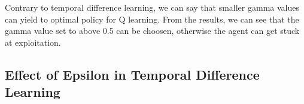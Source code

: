 \documentclass{assignment}
\begin{document}
Contrary to temporal difference learning, we can say that smaller gamma values can yield to optimal policy for Q learning. From the results, we can see that the gamma value set to above 0.5 can be choosen, otherwise the agent can get stuck at exploitation. 

\subsection{Effect of Epsilon in Temporal Difference Learning}
\end{document}
